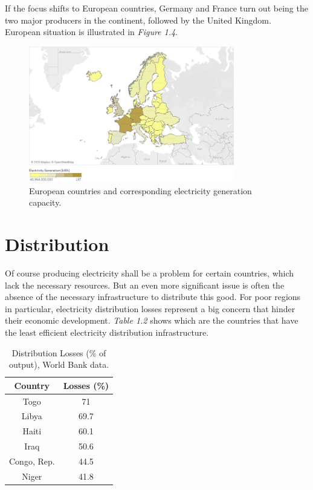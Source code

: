 \documentclass{book}
\begin{document}
If the focus shifts to European countries, Germany and France turn out being the two major producers in the continent, followed by the United Kingdom. European situation is illustrated in \textit{Figure 1.4}.

\bigskip
\begin{figure}[H]
\begin{center}
\captionsetup{justification=centering}
\includegraphics[width=0.8\textwidth]{Images/prod.png}
\caption{European countries and corresponding electricity generation capacity. }
\end{center}
\end{figure}
\bigskip

\section{Distribution}

Of course producing electricity shall be a problem for certain countries, which lack the necessary resources. But an even more significant issue is often the absence of the necessary infrastructure to distribute this good. For poor regions in particular, electricity distribution losses represent  a big concern that hinder their economic development. \textit{Table 1.2} shows which are the countries that have the least efficient electricity distribution infrastructure.

\bigskip
\begin{table}[H]
\begin{center}
\begin{tabular}{|c|c|}
\hline
Country & Losses (\%)\\
\hline
Togo & 71\\
Libya & 69.7\\
Haiti & 60.1\\
Iraq & 50.6\\
Congo, Rep. & 44.5\\
Niger & 41.8\\
\hline
\end{tabular}
\caption{Distribution Losses (\% of output), World Bank data.}
\end{center}
\end{table}
\end{document}
